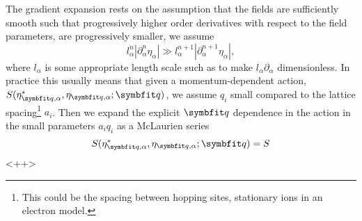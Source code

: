 The gradient expansion rests on the assumption that the fields are sufficiently smooth such that progressively higher order derivatives with
respect to the field parameters, are progressively smaller,
\ie we assume 
\begin{equation}
    \label{eq:Field:Grad:gradientComparison}
    l_\alpha^n|\partial_\alpha^n\eta_\alpha| \gg l_\alpha^{n+1}|\partial_\alpha^{n+1}\eta_\alpha|,
\end{equation}
where $l_\alpha$ is some appropriate length scale such as to make $l_\alpha\partial_\alpha$ dimensionless.
In practice this usually means that given a momentum-dependent action, $S(\eta_{\v{q},\alpha}^\ast,\eta_{\v{q},\alpha};\v{q})$, we assume $q_i$ small compared to the lattice
spacing\footnote{This could be the spacing between hopping sites, \ie stationary ions in an electron model.} $a_i$. Then we expand the
explicit $\v{q}$ dependence in the action in the small parameters $a_iq_i$ as a McLaurien series
\begin{equation}
    \label{eq:Field:Grad:actionExpansion}
    S(\eta_{\v{q},\alpha}^\ast,\eta_{\v{q},\alpha};\v{q}) = S
\end{equation}<++>
